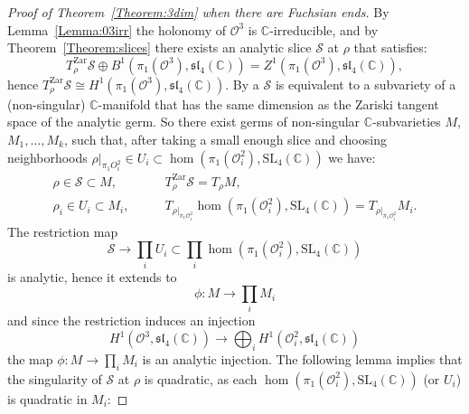 \documentclass[a4paper,11pt]{article}
\begin{document}
\begin{proof}[Proof of Theorem~\ref{Theorem:3dim}
 when there are Fuchsian ends]
By Lemma~\ref{Lemma:03irr} the holonomy of 
$\mathcal O^3$ is $\mathbb C$-irreducible,
and by Theorem~\ref{Theorem:slices}
there exists an analytic slice $\mathcal S$ at $\rho$ that satisfies:
$$T_\rho^{\mathrm{Zar}} \mathcal S\oplus B^1(\pi_1(\mathcal O^3),
\mathfrak{sl}_4(\mathbb C))=
Z^1(\pi_1(\mathcal O^3),
\mathfrak{sl}_4(\mathbb C)),
$$
hence $ 
T_\rho^{\mathrm{Zar}} \mathcal S\cong H^1(\pi_1(\mathcal O^3),
\mathfrak{sl}_4(\mathbb C))
$.
By \cite[Theorem~V.A.14]{GunningRossi}
a $\mathcal S$ is equivalent to a subvariety of a (non-singular) 
$\mathbb C$-manifold that has the same dimension  as the Zariski tangent space
of the analytic germ. So 
there exist germs of non-singular
$\mathbb C$-subvarieties  $M$, $M_1,\ldots,M_k$, such that, after taking
a  small enough slice and choosing neighborhoods $\rho\vert_{\pi_1 O^2_i}
\in U_i\subset  \hom(\pi_1(\mathcal O^2_i),\mathrm{SL}_4(\mathbb C))$ we have:
\begin{align*}
\rho\in \mathcal S\subset M,  & \qquad T_\rho^{\mathrm{Zar}} \mathcal S=T_\rho M,  \\
 \rho_i\in U_i\subset M_i, & \qquad T_{\rho\vert _{\pi_1\mathcal O^2_i} } \hom(\pi_1(\mathcal O^2_i),\mathrm{SL}_4(\mathbb C)) =T_{\rho\vert _{\pi_1\mathcal O^2_i}} M_i.
\end{align*}
% 
% 
The restriction map
$$
\mathcal 
S\to \prod_i U_i\subset\prod_i \hom(\pi_1(\mathcal O^2_i),\mathrm{SL}_4(\mathbb C))
$$
is analytic, hence it extends to %
$$
\phi\colon M\to \prod_i M_i
$$
and since the restriction induces an injection 
$$
H^1(\mathcal O^3,\mathfrak{sl}_4(\mathbb C))
\to
\bigoplus_i 
H^1(\mathcal O^2_i,\mathfrak{sl}_4(\mathbb C) )
$$
the map $\phi \colon M\to \prod_i M_i$ is an analytic injection. The  following lemma implies that the singularity of $\mathcal S$ at $\rho$ is quadratic,
as each  $\hom(\pi_1(\mathcal O^2_i),\mathrm{SL}_4(\mathbb C))$ (or $U_i$)
is quadratic in $M_i$:


\end{proof}
\end{document}
